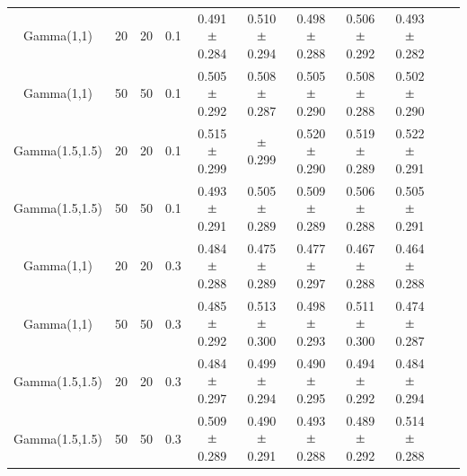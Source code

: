 \documentclass[11pt]{article}
\newcommand{\Mypm}{\mathbin{\tikz [x=1.4ex,y=1.4ex,line width=.1ex] \draw (0.0,0) -- (1.0,0) (0.5,0.08) -- (0.5,0.92) (0.0,0.5) -- (1.0,0.5);}}
\begin{document}
\begin{appendices}
\begin{table}[H]
{\begin{tabular}{ccccccccccc}
					\\
					
					\hline	
					
					Gamma(1,1)	& 20  & 20 & 0.1  & 0.491 $\Mypm$   0.284 & 0.510 $\Mypm$   0.294 & 0.498 $\Mypm$   0.288 & 0.506 $\Mypm$   0.292 & 0.493 $\Mypm$   0.282 \\ 
					Gamma(1,1)	& 50  & 50 & 0.1&  0.505 $\Mypm$   0.292 & 0.508 $\Mypm$   0.287 & 0.505 $\Mypm$   0.290 & 0.508 $\Mypm$   0.288 & 0.502 $\Mypm$   0.290 \\ 
					Gamma(1.5,1.5)	& 20  & 20 & 0.1 &  0.515 $\Mypm$   0.299 &  $\Mypm$   0.299 & 0.520 $\Mypm$   0.290 & 0.519 $\Mypm$   0.289 & 0.522 $\Mypm$   0.291   \\ 
					Gamma(1.5,1.5)	& 50  & 50 & 0.1&  0.493 $\Mypm$   0.291 &  0.505 $\Mypm$   0.289 & 0.509 $\Mypm$   0.289 & 0.506 $\Mypm$   0.288 & 0.505 $\Mypm$   0.291 \\ 
					Gamma(1,1)	& 20  & 20 & 0.3 &  0.484 $\Mypm$   0.288 & 0.475 $\Mypm$   0.289 & 0.477 $\Mypm$   0.297 & 0.467 $\Mypm$   0.288 & 0.464 $\Mypm$   0.288 &  \\ 
					Gamma(1,1)	& 50  & 50 & 0.3 &  0.485 $\Mypm$   0.292 & 0.513 $\Mypm$   0.300 & 0.498 $\Mypm$   0.293 & 0.511 $\Mypm$   0.300 & 0.474 $\Mypm$   0.287 \\  
					Gamma(1.5,1.5)	& 20  & 20 & 0.3 & 0.484 $\Mypm$   0.297 & 0.499 $\Mypm$   0.294 & 0.490 $\Mypm$   0.295 & 0.494 $\Mypm$   0.292 & 0.484 $\Mypm$   0.294 \\ 
					Gamma(1.5,1.5)	& 50  & 50 & 0.3 & 0.509 $\Mypm$   0.289 & 0.490 $\Mypm$  0.291 & 0.493 $\Mypm$   0.288 & 0.489 $\Mypm$   0.292 & 0.514 $\Mypm$   0.288 \\ 
					
					\hline
					
					
					
				\end{tabular}}
				
				
				

\end{table}
\end{appendices}
\end{document}
